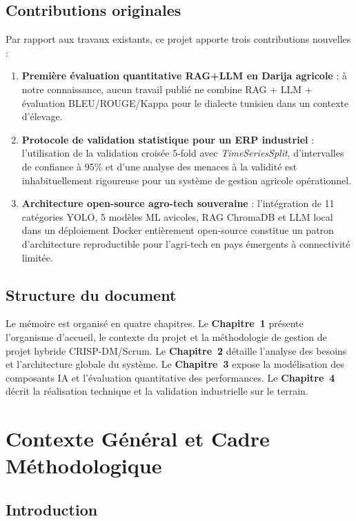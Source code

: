 \section*{Contributions originales}
Par rapport aux travaux existants, ce projet apporte trois contributions nouvelles :
\begin{enumerate}
  \item \textbf{Première évaluation quantitative RAG+LLM en Darija agricole} :
        à notre connaissance, aucun travail publié ne combine RAG + LLM + évaluation
        BLEU/ROUGE/Kappa pour le dialecte tunisien dans un contexte d'élevage.
  \item \textbf{Protocole de validation statistique pour un ERP industriel} :
        l'utilisation de la validation croisée 5-fold avec \textit{TimeSeriesSplit},
        d'intervalles de confiance à 95\% et d'une analyse des menaces à la validité
        est inhabituellement rigoureuse pour un système de gestion agricole opérationnel.
  \item \textbf{Architecture open-source agro-tech souveraine} : l'intégration de
        11 catégories YOLO, 5 modèles ML avicoles, RAG ChromaDB et LLM local dans
        un déploiement Docker entièrement open-source constitue un patron d'architecture
        reproductible pour l'agri-tech en pays émergents à connectivité limitée.
\end{enumerate}

\section*{Structure du document}
Le mémoire est organisé en quatre chapitres. Le \textbf{Chapitre~1} présente
l'organisme d'accueil, le contexte du projet et la méthodologie de gestion
de projet hybride CRISP-DM/Scrum. Le \textbf{Chapitre~2} détaille l'analyse
des besoins et l'architecture globale du système. Le \textbf{Chapitre~3}
expose la modélisation des composants IA et l'évaluation quantitative des
performances. Le \textbf{Chapitre~4} décrit la réalisation technique et
la validation industrielle sur le terrain.

\chapter{Contexte Général et Cadre Méthodologique}
\section*{Introduction}

